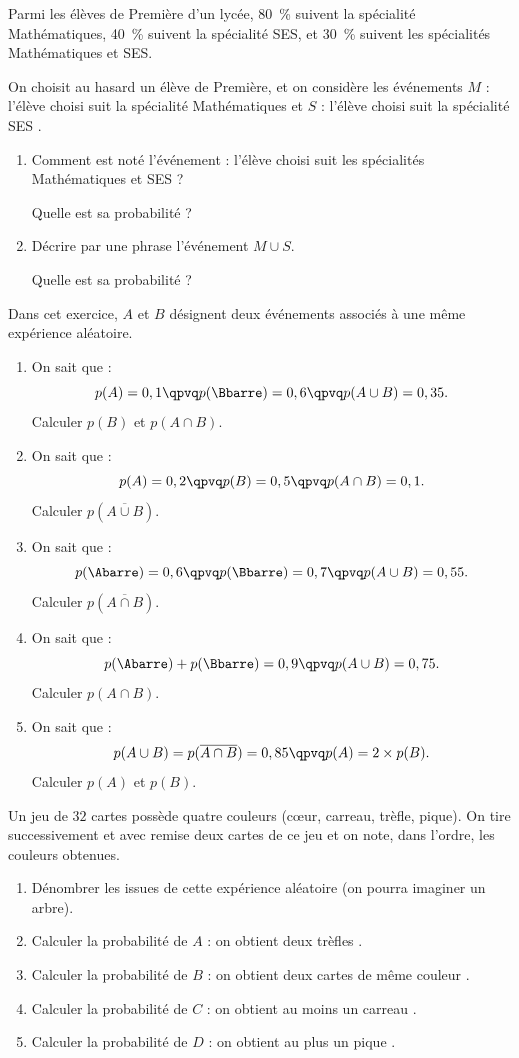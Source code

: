 \exo

Parmi les élèves de Première d'un lycée, \SI[retain-explicit-plus]{80}{\percent} suivent la spécialité Mathématiques, \SI[retain-explicit-plus]{40}{\percent} suivent la spécialité SES, et \SI[retain-explicit-plus]{30}{\percent} suivent les spécialités Mathématiques et SES.

On choisit au hasard un élève de Première, et on considère les événements $M$ : \og l'élève choisi suit la spécialité Mathématiques \fg{} et $S$ : \og l'élève choisi suit la spécialité SES \fg{}.
\begin{enumerate}
\item Comment est noté l'événement : \og l'élève choisi suit les spécialités Mathématiques et SES \fg{} ?

Quelle est sa probabilité ?
\item Décrire par une phrase l'événement $M\cup S$.

Quelle est sa probabilité ?
\end{enumerate}

\exo

Dans cet exercice, $A$ et $B$ désignent deux événements associés à une même expérience aléatoire.
\medskip
\begin{enumerate}
\item On sait que :
\[p(A)=0,1\qpvq p(\Bbarre)=0,6\qpvq p(A\cup B)=0,35.\]
Calculer $p(B)$ et $p(A\cap B)$.
\item On sait que :
\[p(A)=0,2\qpvq p(B)=0,5\qpvq p(A\cap B)=0,1.\]
Calculer $p(\overline{A\cup B})$.
\item On sait que :
\[p(\Abarre)=0,6\qpvq p(\Bbarre)=0,7\qpvq p(A\cup B)=0,55.\]
Calculer $p(\overline{A\cap B})$.
\item On sait que :
\[p(\Abarre)+p(\Bbarre)=0,9\qpvq p(A\cup B)=0,75.\]
Calculer $p(A\cap B)$.
\item On sait que :
\[p(A\cup B)=p(\overline{A\cap B})=0,85\qpvq p(A)=2\times p(B).\]
Calculer $p(A)$ et $p(B)$.
\end{enumerate}

\exo

Un jeu de $32$ cartes possède quatre \og couleurs \fg{} (c\oe{}ur, carreau, trèfle, pique). On tire successivement et avec remise deux cartes de ce jeu et on note, dans l'ordre, les couleurs obtenues.
\begin{enumerate}
\item Dénombrer les issues de cette expérience aléatoire (on pourra imaginer un arbre).
\item Calculer la probabilité de $A$ : \og on obtient deux trèfles \fg{}.
\item Calculer la probabilité de $B$ : \og on obtient deux cartes de même couleur \fg{}.
\item Calculer la probabilité de $C$ : \og on obtient au moins un carreau \fg{}.
\item Calculer la probabilité de $D$ : \og on obtient au plus un pique \fg{}.
\end{enumerate}

